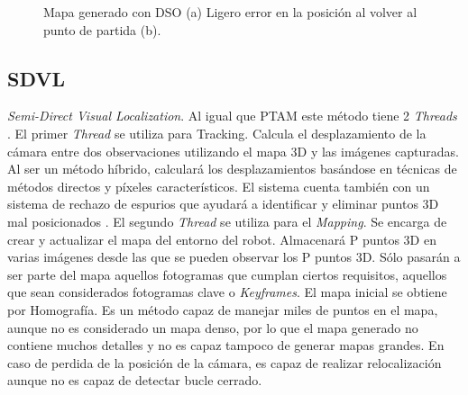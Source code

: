 \begin{figure}[H]
\begin{center}
\hspace{0.5cm}
\end{center}
\caption{Mapa generado con DSO (a) Ligero error en la posición al volver al punto de partida (b).}
\end{figure}

\clearpage

\subsection{SDVL}
\textit{Semi-Direct Visual Localization}. Al igual que PTAM este método tiene 2 \textit{Threads} .
El primer \textit{Thread} se utiliza para Tracking. Calcula el desplazamiento de la cámara entre dos observaciones utilizando el mapa 3D y las imágenes capturadas. Al ser un método híbrido, calculará los desplazamientos basándose en técnicas de métodos directos y píxeles característicos. El sistema cuenta también con un sistema de rechazo de espurios que ayudará a identificar y eliminar puntos 3D mal posicionados \cite{Perdices17}.
El segundo \textit{Thread} se utiliza para el \textit{Mapping}.  Se encarga de crear y actualizar el mapa del entorno del robot. Almacenará P puntos 3D  en varias imágenes desde las que se pueden observar los P puntos 3D. Sólo pasarán a ser parte del mapa aquellos fotogramas que cumplan ciertos requisitos, aquellos que sean considerados fotogramas clave o \textit{Keyframes}.
El mapa inicial se obtiene por Homografía. Es un método capaz de manejar miles de puntos en el mapa, aunque no es considerado un mapa denso, por lo que el mapa generado no contiene muchos detalles y no es capaz tampoco de generar mapas grandes. En caso de perdida de la posición de la cámara, es capaz de realizar relocalización aunque no es capaz de detectar bucle cerrado.


